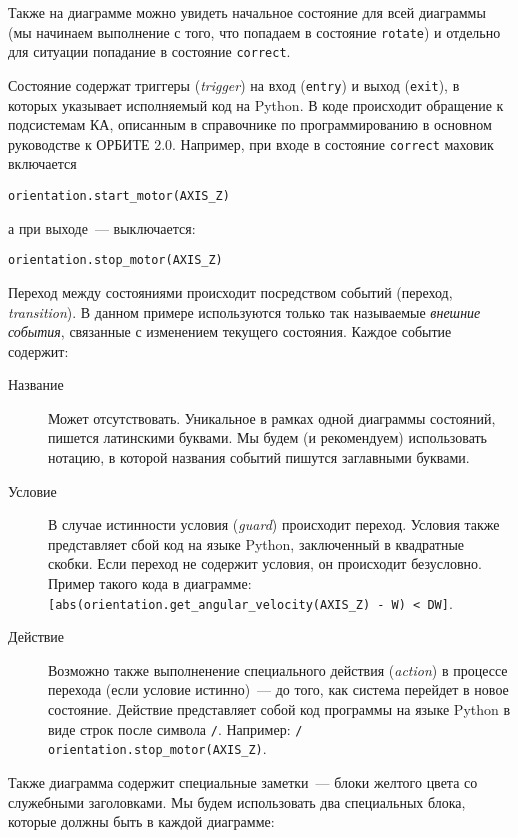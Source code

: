 \documentclass[12pt,a4paper]{article}
\begin{document}
Также на диаграмме можно увидеть начальное состояние для всей диаграммы (мы начинаем
выполнение с того, что попадаем в состояние \verb'rotate') и отдельно для ситуации
попадание в состояние \verb'correct'.

Состояние содержат триггеры (\emph{trigger}) на вход (\verb'entry') и выход (\verb'exit'), в которых
указывает исполняемый код на Python. В коде происходит обращение к подсистемам КА,
описанным в справочнике по программированию в основном руководстве к ОРБИТЕ 2.0. Например,
при входе в состояние  \verb'correct' маховик включается

\begin{verbatim}
orientation.start_motor(AXIS_Z)
\end{verbatim}

а при выходе~--- выключается:

\begin{verbatim}
orientation.stop_motor(AXIS_Z)
\end{verbatim}

Переход между состояниями происходит посредством событий (переход, \emph{transition}). В
данном примере используются только так называемые \emph{внешние события}, связанные с
изменением текущего состояния. Каждое событие содержит:

\begin{description}
\item[Название] Может отсутствовать. Уникальное в рамках одной диаграммы состояний,
  пишется латинскими буквами. Мы будем (и рекомендуем) использовать нотацию, в которой
  названия событий пишутся заглавными буквами.
\item[Условие] В случае истинности условия (\emph{guard}) происходит переход. Условия
  также представляет сбой код на языке Python, заключенный в квадратные скобки. Если
  переход не содержит условия, он происходит безусловно. Пример такого кода в диаграмме:
  \verb'[abs(orientation.get_angular_velocity(AXIS_Z) - W) < DW]'.
\item[Действие] Возможно также выполненение специального действия (\emph{action}) в
  процессе перехода (если условие истинно)~--- до того, как система перейдет в новое
  состояние. Действие представляет собой код программы на языке Python в виде строк после
  символа \verb'/'. Например: \verb'/ orientation.stop_motor(AXIS_Z)'.
\end{description}

Также диаграмма содержит специальные заметки~--- блоки желтого цвета со служебными
заголовками. Мы будем использовать два специальных блока, которые должны быть в каждой
диаграмме:
\end{document}
